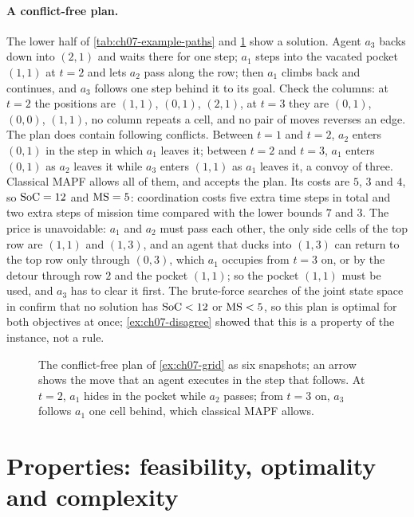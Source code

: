\paragraph{A conflict-free plan.}
The lower half of \cref{tab:ch07-example-paths} and
\cref{fig:ch07-example-solution} show a solution. Agent $a_3$ backs down into
$(2,1)$ and waits there for one step; $a_1$ steps into the vacated pocket
$(1,1)$ at $t = 2$ and lets $a_2$ pass along the row; then $a_1$ climbs back
and continues, and $a_3$ follows one step behind it to its goal. Check the
columns: at $t = 2$ the positions are $(1,1)$, $(0,1)$, $(2,1)$, at $t = 3$
they are $(0,1)$, $(0,0)$, $(1,1)$, no column repeats a cell, and no pair of
moves reverses an edge. The plan does contain following conflicts. Between
$t = 1$ and $t = 2$, $a_2$ enters $(0,1)$ in the step in which $a_1$ leaves
it; between $t = 2$ and $t = 3$, $a_1$ enters $(0,1)$ as $a_2$ leaves it while
$a_3$ enters $(1,1)$ as $a_1$ leaves it, a convoy of three. Classical MAPF
allows all of them, and  accepts the plan. Its costs are
$5$, $3$ and $4$, so $\mathrm{SoC} = 12$ and $\mathrm{MS} = 5$: coordination costs
five extra time steps in total and two extra steps of mission time compared
with the lower bounds $7$ and $3$. The price is unavoidable: $a_1$ and
$a_2$ must pass each other, the only side cells of the top row are $(1,1)$
and $(1,3)$, and an agent that ducks into $(1,3)$ can return to the top row
only through $(0,3)$, which $a_1$ occupies from $t = 3$ on, or by the detour
through row $2$ and the pocket $(1,1)$; so the pocket $(1,1)$ must be used,
and $a_3$ has to clear it first. The brute-force
searches of the joint state space in  confirm that no
solution has $\mathrm{SoC} < 12$ or $\mathrm{MS} < 5$, so this plan is optimal for
both objectives at once; \cref{ex:ch07-disagree} showed that this is a
property of the instance, not a rule.

\begin{figure}[!htb]
  \centering
  \caption{The conflict-free plan of \cref{ex:ch07-grid} as six snapshots;
  an arrow shows the move that an agent executes in the step that follows.
  At $t = 2$, $a_1$ hides in the pocket while $a_2$ passes; from $t = 3$ on,
  $a_3$ follows $a_1$ one cell behind, which classical MAPF allows.}
  \label{fig:ch07-example-solution}
\end{figure}

\section{Properties: feasibility, optimality and complexity}
\label{sec:ch07-properties}


